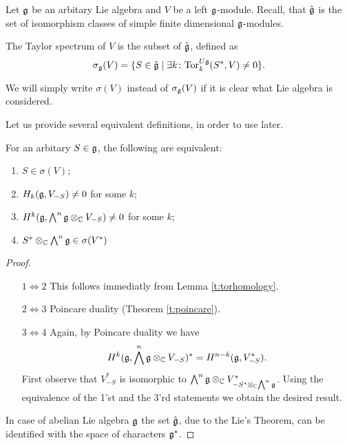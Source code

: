 Let $\mathfrak{g}$ be an arbitary Lie algebra and $V$ be a left $\mathfrak{g}$-module. 
Recall, that $\hat{\mathfrak{g}}$ is the set of isomorphism classes of simple
finite dimensional $\mathfrak{g}$-modules.
\begin{definition}
    The Taylor spectrum of $V$ is the subset of $\hat{\mathfrak{g}}$, defined as
    \[
        \sigma_{\mathfrak{g}}(V)=\{ S\in \hat{\mathfrak{g}} \mid \exists 
            k \colon \mathrm{Tor}^{U\mathfrak{g}}_k(S^*,V)\neq 0\}.
    \]
\end{definition}
We will simply write $\sigma(V)$ instead of $\sigma_{\mathfrak{g}}(V)$ if it is clear what Lie algebra is
considered.

Let us provide several equivalent definitions, in order to use later.
\begin{theorem}
   For an arbitary $S\in\mathfrak{g}$, the following are equivalent:
   \begin{enumerate}
       \item $S \in \sigma(V)$; 
           
       \item $H_k(\mathfrak{g}, V_{-S}) \ne 0$ for some $k$;

       \item $H^k(\mathfrak{g}, \bigwedge^n\mathfrak{g}\otimes_{\mathbb{C}} V_{-S}) \ne 0$ for some $k$;

       \item $S^* \otimes_{\mathbb{C}} \bigwedge^n\mathfrak{g} \in \sigma(V^*)$
   \end{enumerate}
\end{theorem}
\begin{proof}
    \begin{itemize}
        \item[$1 \Leftrightarrow 2$]
            This follows immediatly from Lemma \ref{t:torhomology}.

        \item[$2 \Leftrightarrow 3$]
            Poincare duality (Theorem \ref{t:poincare}).

        \item[$3 \Leftrightarrow 4$]
            Again, by Poincare duality we have
            \[
                H^k(\mathfrak{g}, \bigwedge^n\mathfrak{g} \otimes_{\mathbb{C}} V_{-S})^* = H^{n - k} (\mathfrak{g}, V_{-S}^*).
            \]
            First observe that $V^*_{-S}$ is isomorphic to $\bigwedge^n\mathfrak{g} \otimes_{\mathbb{C}}
            V^*_{-S^* \otimes_{\mathbb{C}} \bigwedge^n\mathfrak{g}}$. Using the equivalence of the 1'st and the
            3'rd statements we obtain the desired result. 
    \end{itemize}

    In case of abelian Lie algebra $\mathfrak{g}$ the set $\hat{\mathfrak{g}}$, due to the Lie's Theorem, 
    can be identified with the space of characters $\mathfrak{g}^*$. 
\end{proof}
